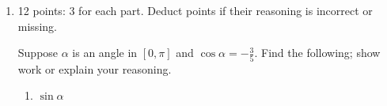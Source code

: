 \documentclass{article}
\begin{document}
\begin{enumerate}
\begin{enumerate}
      \begin{solution}
        If $\alpha$ is the red angle below, then $-\alpha$ is the
        blue angle: 
        \begin{center}
          \begin{tikzangle}[angle=pi/3, secondangle=-pi/3]            
          \end{tikzangle}          
        \end{center}
        By symmetry, the slope of the blue line is the negative of the
        slope of the red line, so $\tan(-\alpha) = - \tan(\alpha) =
        \boxed{-m}$. 
      \end{solution}

    \item
      \begin{problem}[\vfill]
        $\tan (\pi - \alpha)$
      \end{problem}

      \begin{solution}
        If $\alpha$ is the red angle below, then $\pi-\alpha$ is the
        blue angle: 
        \begin{center}
          \begin{tikzangle}[angle=pi/3, secondangle=2*pi/3]            
          \end{tikzangle}          
        \end{center}
        By symmetry, the slope of the blue line is the negative of the
        slope of the red line, so $\tan(\pi-\alpha) = - \tan(\alpha) =
        \boxed{-m}$. 
      \end{solution}      

    \end{enumerate}    


\item 


\begin{grading}
12 points: 3 for each part. Deduct points if their reasoning is incorrect or missing.
\end{grading}

Suppose $\alpha$ is an angle in $[0, \pi]$ and $\cos \alpha = -
  \frac{3}{5}$.  Find the following; show work or explain your reasoning.
  \probonly{}
    \begin{enumerate}
    \item
      \begin{problem}[\vfill]
        $\sin \alpha$
      \end{problem}


\end{enumerate}
\end{enumerate}
\end{document}
